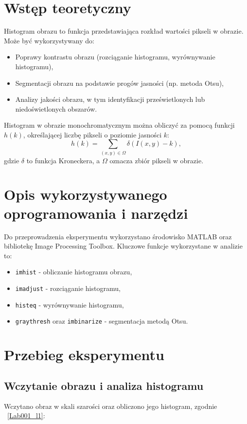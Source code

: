 \section{Wstęp teoretyczny}
Histogram obrazu to funkcja przedstawiająca rozkład wartości pikseli w obrazie. Może być wykorzystywany do:
\begin{itemize}
    \item Poprawy kontrastu obrazu (rozciąganie histogramu, wyrównywanie histogramu),
    \item Segmentacji obrazu na podstawie progów jasności (np. metoda Otsu),
    \item Analizy jakości obrazu, w tym identyfikacji prześwietlonych lub niedoświetlonych obszarów.
\end{itemize}

Histogram w obrazie monochromatycznym można obliczyć za pomocą funkcji $h(k)$, określającej liczbę pikseli o poziomie jasności $k$:
\begin{equation}
h(k) = \sum_{(x,y) \in \Omega} \delta(I(x,y) - k),
\end{equation}
gdzie $\delta$ to funkcja Kroneckera, a $\Omega$ oznacza zbiór pikseli w obrazie.

\section{Opis wykorzystywanego oprogramowania i narzędzi}
Do przeprowadzenia eksperymentu wykorzystano środowisko MATLAB oraz bibliotekę Image Processing Toolbox. Kluczowe funkcje wykorzystane w analizie to:
\begin{itemize}
    \item \texttt{imhist} - obliczanie histogramu obrazu,
    \item \texttt{imadjust} - rozciąganie histogramu,
    \item \texttt{histeq} - wyrównywanie histogramu,
    \item \texttt{graythresh} oraz \texttt{imbinarize} - segmentacja metodą Otsu.
\end{itemize}

\section{Przebieg eksperymentu}
\subsection{Wczytanie obrazu i analiza histogramu}
Wczytano obraz w skali szarości oraz obliczono jego histogram, zgodnie \listingname~\ref{Lab001_l1}:

